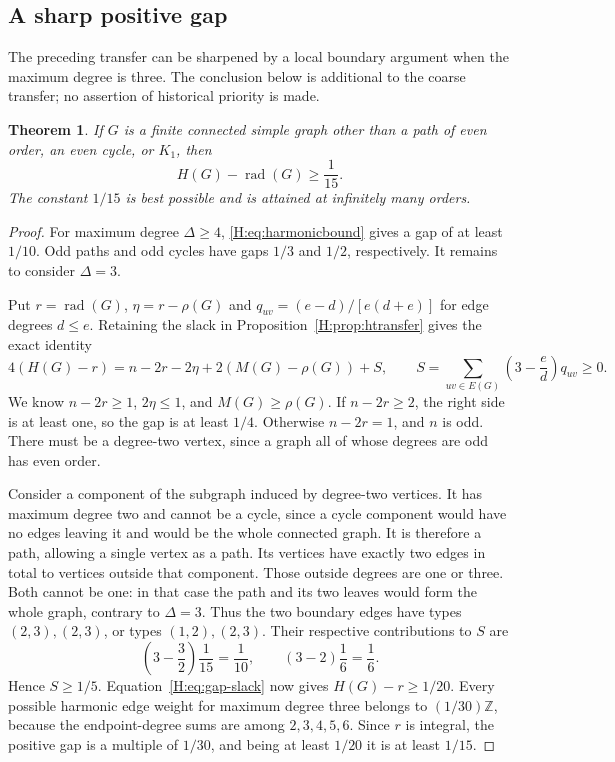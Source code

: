\documentclass[11pt,a4paper]{article}
\newtheorem{theorem}{Theorem}[section]
\theoremstyle{remark}\newtheorem{remark}[theorem]{Remark}
\newcommand{\rad}{\operatorname{rad}}\newcommand{\diam}{\operatorname{diam}}\newcommand{\dist}{\operatorname{dist}}
\numberwithin{equation}{section}
\begin{document}
\subsection{A sharp positive gap}
The preceding transfer can be sharpened by a local boundary argument
when the maximum degree is three. The conclusion below is additional
to the coarse transfer; no assertion of historical priority is made.

\begin{theorem}\label{H:thm:sharp-gap}
If $G$ is a finite connected simple graph other than a path of even
order, an even cycle, or $K_1$, then
\[
 H(G)-\rad(G)\ge\frac1{15}.
\]
The constant $1/15$ is best possible and is attained at infinitely many
orders.
\end{theorem}
\begin{proof}
For maximum degree $\Delta\ge4$, \eqref{H:eq:harmonicbound} gives a gap
of at least $1/10$. Odd paths and odd cycles have gaps $1/3$ and $1/2$,
respectively. It remains to consider $\Delta=3$.

Put $r=\rad(G)$, $\eta=r-\rho(G)$ and
$q_{uv}=(e-d)/[e(d+e)]$ for edge degrees $d\le e$. Retaining the slack
in Proposition~\ref{H:prop:htransfer} gives the exact identity
\begin{equation}\label{H:eq:gap-slack}
 4(H(G)-r)=n-2r-2\eta+2(M(G)-\rho(G))+S,
 \qquad
 S=\sum_{uv\in E(G)}\left(3-\frac ed\right)q_{uv}\ge0.
\end{equation}
We know $n-2r\ge1$, $2\eta\le1$, and $M(G)\ge\rho(G)$.
If $n-2r\ge2$, the right side is at least one, so the gap is at least
$1/4$. Otherwise $n-2r=1$, and $n$ is odd. There must be a degree-two
vertex, since a graph all of whose degrees are odd has even order.

Consider a component of the subgraph induced by degree-two vertices.
It has maximum degree two and cannot be a cycle, since a cycle component
would have no edges leaving it and would be the whole connected graph.
It is therefore a path, allowing a single vertex as a path. Its vertices
have exactly two edges in total to vertices outside that component.
Those outside degrees are one or three. Both cannot be one: in that
case the path and its two leaves would form the whole graph, contrary
to $\Delta=3$. Thus the two boundary edges have types $(2,3),(2,3)$,
or types $(1,2),(2,3)$. Their respective contributions to $S$ are
\[
 \left(3-\frac32\right)\frac1{15}=\frac1{10},
 \qquad
 (3-2)\frac16=\frac16.
\]
Hence $S\ge1/5$. Equation~\eqref{H:eq:gap-slack} now gives
$H(G)-r\ge1/20$. Every possible harmonic edge weight for maximum
degree three belongs to $(1/30)\mathbb Z$, because the endpoint-degree
sums are among $2,3,4,5,6$. Since $r$ is integral, the positive gap is
a multiple of $1/30$, and being at least $1/20$ it is at least $1/15$.


\end{proof}
\end{document}
